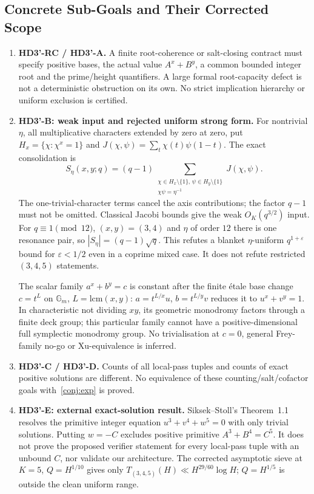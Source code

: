 \documentclass[11pt,a4paper]{article}
\begin{document}
\subsection*{Concrete Sub-Goals and Their Corrected Scope}
\begin{enumerate}[leftmargin=*]
\item \textbf{HD3'-RC / HD3'-A.} A finite root-coherence or salt-closing
contract must specify positive bases, the actual value $A^x+B^y$, a
common bounded integer root and the prime/height quantifiers. A large
formal root-capacity defect is not a deterministic obstruction on its
own. No strict implication hierarchy or uniform exclusion is certified.
\item \textbf{HD3'-B: weak input and rejected uniform strong form.}
For nontrivial $\eta$, all multiplicative characters extended by zero
at zero, put $H_x=\{\chi:\chi^x=1\}$ and
$J(\chi,\psi)=\sum_t\chi(t)\psi(1-t)$. The exact consolidation is
\[
 S_\eta(x,y;q)=(q-1)
 \sum_{\substack{\chi\in H_x\setminus\{1\},\,\psi\in H_y\setminus\{1\}\\
                 \chi\psi=\eta^{-1}}}J(\chi,\psi).
\]
The one-trivial-character terms cancel the axis contributions;
the factor $q-1$ must not be omitted. Classical Jacobi bounds
\cite[Ch.~8]{IrelandRosen} give the weak $O_K(q^{3/2})$ input.
For $q\equiv1\pmod{12}$, $(x,y)=(3,4)$ and $\eta$ of order $12$
there is one resonance pair, so
$|S_\eta|=(q-1)\sqrt q$. This refutes a blanket
$\eta$-uniform $q^{1+\varepsilon}$ bound for $\varepsilon<1/2$
even in a coprime mixed case. It does not refute restricted
$(3,4,5)$ statements.

The scalar family $a^x+b^y=c$ is constant after the finite étale
base change $c=t^L$ on $\mathbb G_m$, $L=\mathrm{lcm}(x,y)$:
$a=t^{L/x}u$, $b=t^{L/y}v$ reduces it to $u^x+v^y=1$.
In characteristic not dividing $xy$, its geometric monodromy factors
through a finite deck group; this particular family cannot have a
positive-dimensional full symplectic monodromy group.
No trivialisation at $c=0$, general Frey-family no-go or Xu-equivalence
\cite{Xu2020,FouvryKatz2001,KatzTwistedL} is inferred.
\item \textbf{HD3'-C / HD3'-D.} Counts of all local-pass tuples and
counts of exact positive solutions are different. No equivalence of
these counting/salt/cofactor goals with~\cref{conj:exp} is proved.
\item \textbf{HD3'-E: external exact-solution result.}
Siksek--Stoll's Theorem~1.1~\cite{SiksekStoll2012} resolves the
primitive integer equation $u^3+v^4+w^5=0$ with only trivial solutions.
Putting $w=-C$ excludes positive primitive $A^3+B^4=C^5$.
It does not prove the proposed verifier statement for every local-pass
tuple with an unbound $C$, nor validate our architecture.
The corrected asymptotic sieve at $K=5$, $Q=H^{1/10}$ gives only
$T_{(3,4,5)}(H)\ll H^{29/60}\log H$; $Q=H^{1/5}$ is outside
the clean uniform range.
\end{enumerate}
\end{document}
